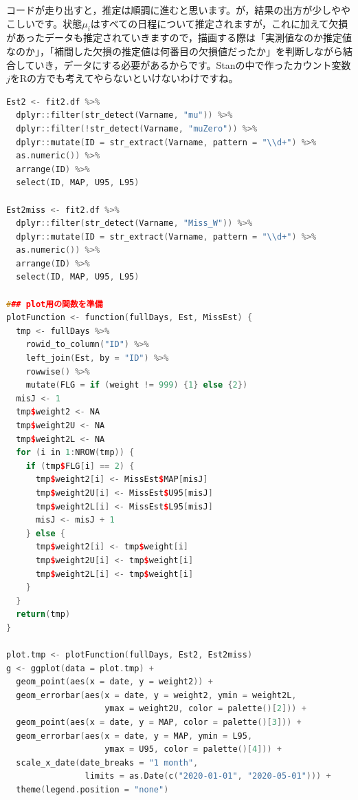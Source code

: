 \documentclass{ltjsbook}
\begin{document}
コードが走り出すと，推定は順調に進むと思います。が，結果の出方が少しややこしいです。状態$\mu_i$はすべての日程について推定されますが，これに加えて欠損があったデータも推定されていきますので，描画する際は「実測値なのか推定値なのか」，「補間した欠損の推定値は何番目の欠損値だったか」を判断しながら結合していき，データにする必要があるからです。Stanの中で作ったカウント変数$j$をRの方でも考えてやらないといけないわけですね。
\begin{lstlisting}[language=c++,label={code:29_04b},caption={プロット用にデータを整形する関数とプロットのコード}]
Est2 <- fit2.df %>%
  dplyr::filter(str_detect(Varname, "mu")) %>%
  dplyr::filter(!str_detect(Varname, "muZero")) %>%
  dplyr::mutate(ID = str_extract(Varname, pattern = "\\d+") %>% 
  as.numeric()) %>%
  arrange(ID) %>%
  select(ID, MAP, U95, L95)

Est2miss <- fit2.df %>%
  dplyr::filter(str_detect(Varname, "Miss_W")) %>%
  dplyr::mutate(ID = str_extract(Varname, pattern = "\\d+") %>% 
  as.numeric()) %>%
  arrange(ID) %>%
  select(ID, MAP, U95, L95)

### plot用の関数を準備
plotFunction <- function(fullDays, Est, MissEst) {
  tmp <- fullDays %>%
    rowid_to_column("ID") %>%
    left_join(Est, by = "ID") %>%
    rowwise() %>%
    mutate(FLG = if (weight != 999) {1} else {2})
  misJ <- 1
  tmp$weight2 <- NA
  tmp$weight2U <- NA
  tmp$weight2L <- NA
  for (i in 1:NROW(tmp)) {
    if (tmp$FLG[i] == 2) {
      tmp$weight2[i] <- MissEst$MAP[misJ]
      tmp$weight2U[i] <- MissEst$U95[misJ]
      tmp$weight2L[i] <- MissEst$L95[misJ]
      misJ <- misJ + 1
    } else {
      tmp$weight2[i] <- tmp$weight[i]
      tmp$weight2U[i] <- tmp$weight[i]
      tmp$weight2L[i] <- tmp$weight[i]
    }
  }
  return(tmp)
}

plot.tmp <- plotFunction(fullDays, Est2, Est2miss)
g <- ggplot(data = plot.tmp) +
  geom_point(aes(x = date, y = weight2)) +
  geom_errorbar(aes(x = date, y = weight2, ymin = weight2L, 
                    ymax = weight2U, color = palette()[2])) +
  geom_point(aes(x = date, y = MAP, color = palette()[3])) +
  geom_errorbar(aes(x = date, y = MAP, ymin = L95, 
                    ymax = U95, color = palette()[4])) +
  scale_x_date(date_breaks = "1 month", 
                limits = as.Date(c("2020-01-01", "2020-05-01"))) +
  theme(legend.position = "none")
\end{lstlisting}
\end{document}
